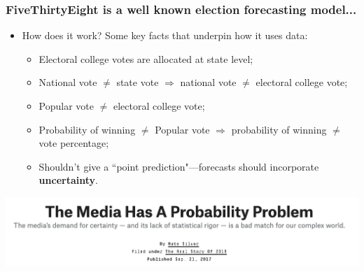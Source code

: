 \documentclass[aspectratio=169]{beamer}
\theoremstyle{principle}
\begin{document}
\begin{frame}
\frametitle{FiveThirtyEight is a well known election forecasting model...}

\begin{itemize}
\item How does it work?  Some key facts that underpin how it uses data:
\begin{itemize}
\item Electoral college votes are allocated at state level;
\bigskip

\item National vote $\neq$ state vote $\Rightarrow$ national vote $\neq$ electoral college vote;
\bigskip

\item Popular vote $\neq$ electoral college vote;
\bigskip

\item Probability of winning $\neq$ Popular vote $\Rightarrow$ probability of winning $\neq$ vote percentage;
\bigskip
 
\item Shouldn't give a ``point prediction"—forecasts should incorporate \textbf{uncertainty}.
\end{itemize}
\end{itemize}

\end{frame}

\begin{frame}

\begin{center}
\includegraphics[scale=0.4]{prob-problem.png}
\end{center}

\end{frame}
\end{document}
